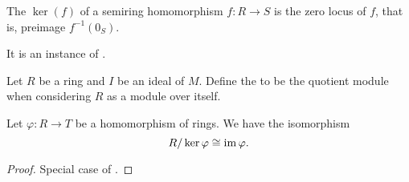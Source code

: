 \begin{definition}\label{def:semiring_kernel}
  The  \( \ker(f) \) of a semiring homomorphism \( f: R \to S \) is the zero locus of \( f \), that is, preimage \( f^{-1}(0_S) \).

  It is an instance of .
\end{definition}

\begin{definition}\label{def:quotient_semiring}
  Let \( R \) be a ring and \( I \) be an ideal of \( M \). Define the  to be the quotient module when considering \( R \) as a module over itself.
\end{definition}

\begin{theorem}\label{thm:homomorphism_theorem_for_rings}
  Let \( \varphi: R \to T \) be a homomorphism of rings. We have the isomorphism
  \begin{equation*}
    R / \ker \varphi \cong \operatorname{im} \varphi.
  \end{equation*}
\end{theorem}
\begin{proof}
  Special case of .
\end{proof}

